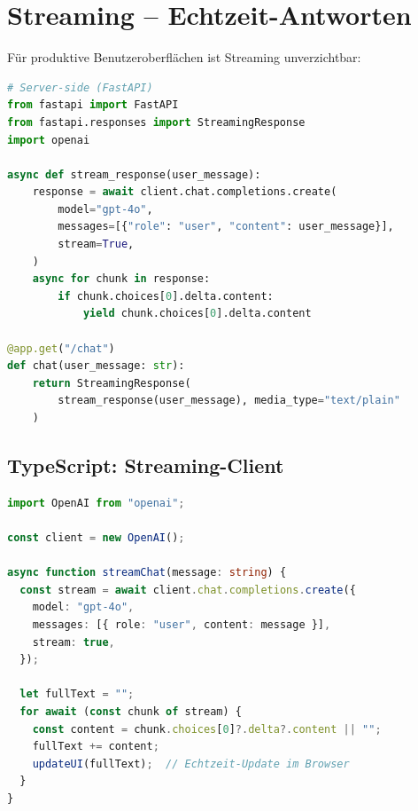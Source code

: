\section{Streaming -- Echtzeit-Antworten}

Für produktive Benutzeroberflächen ist Streaming unverzichtbar:

\begin{lstlisting}[language=Python, caption={Streaming-API für Echtzeit-Feedback}, label=lst:streaming]
# Server-side (FastAPI)
from fastapi import FastAPI
from fastapi.responses import StreamingResponse
import openai

async def stream_response(user_message):
    response = await client.chat.completions.create(
        model="gpt-4o",
        messages=[{"role": "user", "content": user_message}],
        stream=True,
    )
    async for chunk in response:
        if chunk.choices[0].delta.content:
            yield chunk.choices[0].delta.content

@app.get("/chat")
def chat(user_message: str):
    return StreamingResponse(
        stream_response(user_message), media_type="text/plain"
    )
\end{lstlisting}

\subsection{TypeScript: Streaming-Client}

\begin{lstlisting}[language=TypeScript, caption={Streaming-Client in TypeScript}, label=lst:ts-stream]
import OpenAI from "openai";

const client = new OpenAI();

async function streamChat(message: string) {
  const stream = await client.chat.completions.create({
    model: "gpt-4o",
    messages: [{ role: "user", content: message }],
    stream: true,
  });

  let fullText = "";
  for await (const chunk of stream) {
    const content = chunk.choices[0]?.delta?.content || "";
    fullText += content;
    updateUI(fullText);  // Echtzeit-Update im Browser
  }
}
\end{lstlisting}


